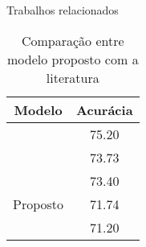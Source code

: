 \begin{frame}{Trabalhos relacionados}
    
\begin{table}[!htb]
\centering
\caption{Comparação entre modelo proposto com a literatura}
\label{tbl:results}
\begin{tabular}{@{}cc@{}}
\toprule
Modelo                                                     & Acurácia \\ \midrule
\cite{DBLP:journals/corr/PramerdorferK16} & 75.20     \\
\cite{Kim2016FusingAA}                    & 73.73    \\
\cite{al2016facial}                       & 73.40     \\
\rowcolor{LightCyan} Proposto                                            & 71.74    \\
\cite{DBLP:journals/corr/Tang13}          & 71.20     \\ \bottomrule
\end{tabular}
\end{table}

    
\end{frame}